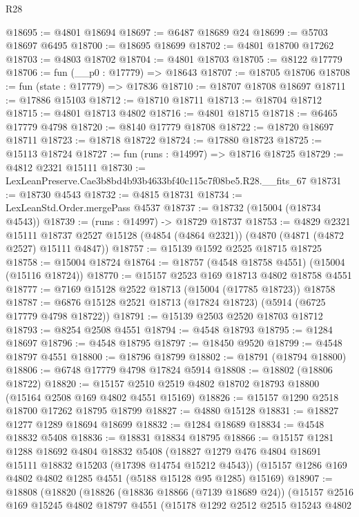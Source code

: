 \begin{lexlean}{R28}
\begin{coremodule}
@18695 := @4801 @18694
@18697 := @6487 @18689 @24
@18699 := @5703 @18697 @6495
@18700 := @18695 @18699
@18702 := @4801 @18700 @17262
@18703 := @4803 @18702
@18704 := @4801 @18703
@18705 := @8122 @17779
@18706 := fun (__p0 : @17779) => @18643
@18707 := @18705 @18706
@18708 := fun (state : @17779) => @17836
@18710 := @18707 @18708 @18697
@18711 := @17886 @15103
@18712 := @18710 @18711
@18713 := @18704 @18712
@18715 := @4801 @18713 @4802
@18716 := @4801 @18715
@18718 := @6465 @17779 @4798
@18720 := @8140 @17779 @18708
@18722 := @18720 @18697 @18711
@18723 := @18718 @18722
@18724 := @17880 @18723
@18725 := @15113 @18724
@18727 := fun (runs : @14997) => @18716 @18725
@18729 := @4812 @2321 @15111
@18730 := LexLeanPreserve.Cae3b8bd4b93b4633bf40c115c7f08be5.R28.__fits_67
@18731 := @18730 @4543
@18732 := @4815 @18731
@18734 := LexLeanStd.Order.mergePass @4537
@18737 := @18732 (@15004 (@18734 @4543))
@18739 := (runs : @14997) -> @18729 @18737
@18753 := @4829
    @2321
    @15111
    @18737
    @2527
    @15128
    (@4854 (@4864 @2321))
    (@4870 (@4871 (@4872 @2527) @15111 @4847))
@18757 := @15139 @1592 @2525 @18715 @18725
@18758 := @15004 @18724
@18764 := @18757 (@4548 @18758 @4551) (@15004 (@15116 @18724))
@18770 := @15157 @2523 @169 @18713 @4802 @18758 @4551
@18777 := @7169 @15128 @2522 @18713 (@15004 (@17785 @18723)) @18758
@18787 := @6876 @15128 @2521 @18713 (@17824 @18723) (@5914 (@6725 @17779 @4798 @18722))
@18791 := @15139 @2503 @2520 @18703 @18712
@18793 := @8254 @2508 @4551
@18794 := @4548 @18793
@18795 := @1284 @18697
@18796 := @4548 @18795
@18797 := @18450 @9520
@18799 := @4548 @18797 @4551
@18800 := @18796 @18799
@18802 := @18791 (@18794 @18800)
@18806 := @6748 @17779 @4798 @17824 @5914
@18808 := @18802 (@18806 @18722)
@18820 := @15157 @2510 @2519 @4802 @18702 @18793 @18800 (@15164 @2508 @169 @4802 @4551 @15169)
@18826 := @15157 @1290 @2518 @18700 @17262 @18795 @18799
@18827 := @4880 @15128
@18831 := @18827 @1277 @1289 @18694 @18699
@18832 := @1284 @18689
@18834 := @4548 @18832 @5408
@18836 := @18831 @18834 @18795
@18866 := @15157
    @1281
    @1288
    @18692
    @4804
    @18832
    @5408
    (@18827 @1279 @476 @4804 @18691 @15111 @18832 @15203 (@17398 @14754 @15212 @4543))
    (@15157 @1286 @169 @4802 @4802 @1285 @4551 (@5188 @15128 @95 @1285) @15169)
@18907 := @18808
    (@18820
      (@18826
        (@18836 @18866 (@7139 @18689 @24))
        (@15157
          @2516
          @169
          @15245
          @4802
          @18797
          @4551
          (@15178
            @1292
            @2512
            @2515
            @15243
            @4802

\end{coremodule}
\end{lexlean}
